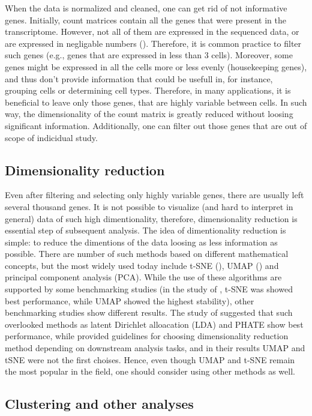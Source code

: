When the data is normalized and cleaned, one can get rid of not informative genes.
Initially, count matrices contain all the genes that were present in the transcriptome.
However, not all of them are expressed in the sequenced data, or are expressed in negligable numbers (\cite{Heumos2023}).
Therefore, it is common practice to filter such genes (e.g., genes that are expressed in less than 3 cells).
Moreover, some genes might be expressed in all the cells more or less evenly (housekeeping genes),
and thus don't provide information that could be usefull in, for instance, grouping cells or determining cell types.
Therefore, in many applications, it is beneficial to leave only those genes, that are highly variable between cells.
In such way, the dimensionality of the count matrix is greatly reduced without loosing significant information.
Additionally, one can filter out those genes that are out of scope of indicidual study.

\subsection{Dimensionality reduction}

Even after filtering and selecting only highly variable genes, there are usually left several thousand genes.
It is not possible to visualize (and hard to interpret in general) data of such high dimentionality, therefore,
dimensionality reduction is essential step of subsequent analysis.
The idea of dimentionality reduction is simple:
to reduce the dimentions of the data loosing as less information as possible.
There are number of such methods based on different mathematical concepts, but the most widely used today include
t-SNE (\cite{Hinton2002}), UMAP (\cite{McInnes2018}) and principal component analysis (PCA).
While the use of these algorithms are supported by some benchmarking studies
(in the study of \cite{Xiang2021}, t-SNE was showed best performance, while UMAP showed the highest stability),
other benchmarking studies show different results.
The study of \textcite{Koch2021} suggested that such overlooked methods as
latent Dirichlet alloacation (LDA) and PHATE show best performance,
while \textcite{Sun2019} provided guidelines for choosing dimensionality reduction method
depending on downstream analysis tasks, and in their results UMAP and tSNE were not the first choises.
Hence, even though UMAP and t-SNE remain the most popular in the field, one should consider using other methods as well.

\subsection{Clustering and other analyses}

